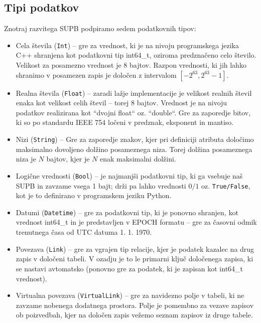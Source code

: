 \documentclass[a4paper,12pt,openright]{book}
\begin{document}
        \subsection{Tipi podatkov}
        Znotraj razvitega SUPB podpiramo sedem podatkovnih tipov:
        \begin{itemize}
            \item Cela števila ({\tt Int}) – gre za vrednost, ki je na nivoju programskega jezika C++ shranjena kot podatkovni tip int64\_t, oziroma predznačeno celo število. Velikost za posamezno vrednost je 8 bajtov. Razpon vrednosti, ki jih lahko shranimo v posamezen zapis je določen z intervalom $[-2^{63}, 2^{63} - 1]$.
            \item Realna števila ({\tt Float}) – zaradi lažje implementacije je velikost realnih števil enaka kot velikost celih števil – torej 8 bajtov. Vrednost je na nivoju podatkov realizirana kot ``dvojni float`` oz. ``double``. Gre za zaporedje bitov, ki so po standardu IEEE 754 \cite{kahan1996ieee} ločeni v predznak, eksponent in mantiso.
            \item Nizi ({\tt String}) – Gre za zaporedje znakov, kjer pri definiciji atributa določimo maksimalno dovoljeno dolžino posameznega niza. Torej dolžina posameznega niza je $N$ bajtov, kjer je $N$ enak maksimalni dolžini.
            \item Logične vrednosti ({\tt Bool}) – je najmanjši podatkovni tip, ki ga vsebuje naš SUPB in zavzame vsega 1 bajt; drži pa lahko vrednosti $0/1$ oz. {\tt True/False}, kot je to definirano v programskem jeziku Python.
            \item Datumi ({\tt Datetime}) – gre za podatkovni tip, ki je ponovno shranjen, kot vrednost int64\_t in je predstavljen v EPOCH formatu \cite{EPOCH_FORMAT} – gre za časovni odmik trenutnega časa od UTC datuma 1. 1. 1970. 
            \item Povezava ({\tt Link}) – gre za vgrajen tip relacije, kjer je podatek kazalec na drug zapis v določeni tabeli. V ozadju je to le primarni ključ določenega zapisa, ki se nastavi avtomatsko (ponovno gre za podatek, ki je zapisan kot int64\_t vrednost).
            \item Virtualna povezava ({\tt VirtualLink}) – gre za navidezno polje v tabeli, ki ne zavzame nobenega dodatnega prostora. Polje je pomembno za vezave zapisov ob poizvedbah, kjer na določen zapis vežemo seznam zapisov iz druge tabele.  
        \end{itemize}
        
\end{document}
